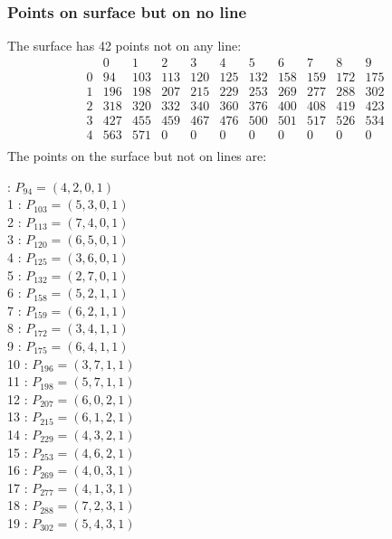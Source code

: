 \documentclass{article}
\begin{document}
{\subsubsection*{Points on surface but on no line}
The surface has 42 points not on any line:\\
$$
\begin{array}{r|*{10}{r}}
 & 0 & 1 & 2 & 3 & 4 & 5 & 6 & 7 & 8 & 9\\
\hline
0 & 94 & 103 & 113 & 120 & 125 & 132 & 158 & 159 & 172 & 175\\
1 & 196 & 198 & 207 & 215 & 229 & 253 & 269 & 277 & 288 & 302\\
2 & 318 & 320 & 332 & 340 & 360 & 376 & 400 & 408 & 419 & 423\\
3 & 427 & 455 & 459 & 467 & 476 & 500 & 501 & 517 & 526 & 534\\
4 & 563 & 571 & 0 & 0 & 0 & 0 & 0 & 0 & 0 & 0\\
\end{array}
$$
The points on the surface but not on lines are:\\
\begin{multicols}{2}
 : $P_{94}=( 4, 2, 0, 1 )$\\
1 : $P_{103}=( 5, 3, 0, 1 )$\\
2 : $P_{113}=( 7, 4, 0, 1 )$\\
3 : $P_{120}=( 6, 5, 0, 1 )$\\
4 : $P_{125}=( 3, 6, 0, 1 )$\\
5 : $P_{132}=( 2, 7, 0, 1 )$\\
6 : $P_{158}=( 5, 2, 1, 1 )$\\
7 : $P_{159}=( 6, 2, 1, 1 )$\\
8 : $P_{172}=( 3, 4, 1, 1 )$\\
9 : $P_{175}=( 6, 4, 1, 1 )$\\
10 : $P_{196}=( 3, 7, 1, 1 )$\\
11 : $P_{198}=( 5, 7, 1, 1 )$\\
12 : $P_{207}=( 6, 0, 2, 1 )$\\
13 : $P_{215}=( 6, 1, 2, 1 )$\\
14 : $P_{229}=( 4, 3, 2, 1 )$\\
15 : $P_{253}=( 4, 6, 2, 1 )$\\
16 : $P_{269}=( 4, 0, 3, 1 )$\\
17 : $P_{277}=( 4, 1, 3, 1 )$\\
18 : $P_{288}=( 7, 2, 3, 1 )$\\
19 : $P_{302}=( 5, 4, 3, 1 )$\\

\end{multicols}}
\end{document}
